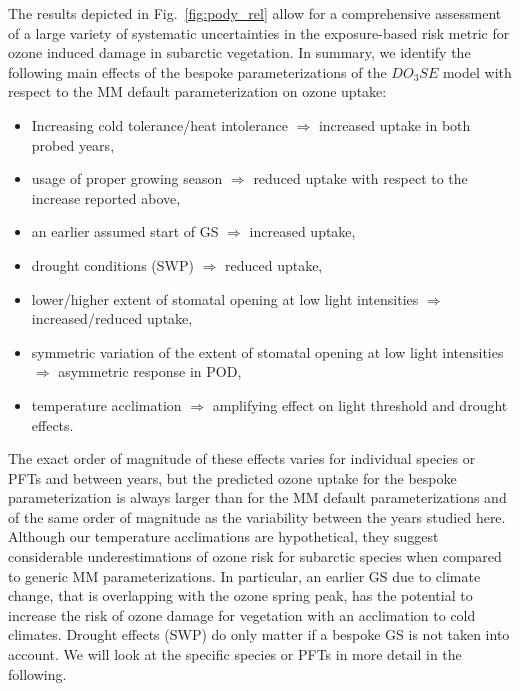\documentclass[bg, manuscript]{copernicus}
\begin{document}
The results depicted in Fig.~\ref{fig:pody_rel} allow for a comprehensive assessment of a large variety of systematic uncertainties in the exposure-based risk metric for ozone induced damage in subarctic vegetation. In summary, we identify the following main effects of the bespoke parameterizations of the $DO_3SE$ model with respect to the MM default parameterization on ozone uptake:
\begin{itemize}
  \itemsep0pt
\item Increasing cold tolerance/heat intolerance $\Rightarrow$ increased uptake in both probed years,
\item usage of proper growing season $\Rightarrow$ reduced uptake with respect to the increase reported above,
\item an earlier assumed start of GS $\Rightarrow$ increased uptake,
\item drought conditions (SWP) $\Rightarrow$ reduced uptake,
\item lower/higher extent of stomatal opening at low light intensities $\Rightarrow$ increased/reduced uptake,
\item symmetric variation of the extent of stomatal opening at low light intensities $\Rightarrow$ asymmetric response in POD,
\item temperature acclimation $\Rightarrow$ amplifying effect on light threshold and drought effects.
\end{itemize}
The exact order of magnitude of these effects varies for individual species or PFTs and between years, but the predicted ozone uptake for the bespoke parameterization is always larger than for the MM default parameterizations and of the same order of magnitude as the variability between the years studied here. Although our temperature acclimations are hypothetical, they suggest considerable underestimations of ozone risk for subarctic species when compared to generic MM parameterizations. In particular, an earlier GS due to climate change, that is overlapping with the ozone spring peak, has the potential to increase the risk of ozone damage for vegetation with an acclimation to cold climates. Drought effects (SWP) do only matter if a bespoke GS is not taken into account. We will look at the specific species or PFTs in more detail in the following.
\end{document}
